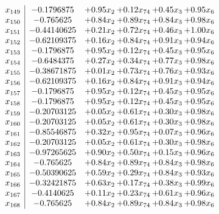 \documentclass[8pt]{article}
\begin{document}
\[\begin{array}{c| c c@{\hskip 2pt} c@{\hskip 2pt} c@{\hskip 2pt} c@{\hskip 2pt} }
 x_{149}   &  -0.1796875 & +  0.95 x_{2} & +  0.12 x_{74} & +  0.45 x_{3} & +  0.95 x_{6}\\
 x_{150}   &  -0.765625 & +  0.84 x_{2} & +  0.89 x_{74} & +  0.84 x_{3} & +  0.98 x_{6}\\
 x_{151}   &  -0.44140625 & +  0.21 x_{2} & +  0.72 x_{74} & +  0.46 x_{3} & +  1.00 x_{6}\\
 x_{152}   &  -0.62109375 & +  0.16 x_{2} & +  0.84 x_{74} & +  0.91 x_{3} & +  0.94 x_{6}\\
 x_{153}   &  -0.1796875 & +  0.95 x_{2} & +  0.12 x_{74} & +  0.45 x_{3} & +  0.95 x_{6}\\
 x_{154}   &  -0.6484375 & +  0.27 x_{2} & +  0.34 x_{74} & +  0.77 x_{3} & +  0.98 x_{6}\\
 x_{155}   &  -0.38671875 & +  0.01 x_{2} & +  0.73 x_{74} & +  0.76 x_{3} & +  0.93 x_{6}\\
 x_{156}   &  -0.62109375 & +  0.16 x_{2} & +  0.84 x_{74} & +  0.91 x_{3} & +  0.94 x_{6}\\
 x_{157}   &  -0.1796875 & +  0.95 x_{2} & +  0.12 x_{74} & +  0.45 x_{3} & +  0.95 x_{6}\\
 x_{158}   &  -0.1796875 & +  0.95 x_{2} & +  0.12 x_{74} & +  0.45 x_{3} & +  0.95 x_{6}\\
 x_{159}   &  -0.20703125 & +  0.05 x_{2} & +  0.61 x_{74} & +  0.30 x_{3} & +  0.98 x_{6}\\
 x_{160}   &  -0.20703125 & +  0.05 x_{2} & +  0.61 x_{74} & +  0.30 x_{3} & +  0.98 x_{6}\\
 x_{161}   &  -0.85546875 & +  0.32 x_{2} & +  0.95 x_{74} & +  0.07 x_{3} & +  0.96 x_{6}\\
 x_{162}   &  -0.20703125 & +  0.05 x_{2} & +  0.61 x_{74} & +  0.30 x_{3} & +  0.98 x_{6}\\
 x_{163}   &  -0.97265625 & +  0.90 x_{2} & +  0.50 x_{74} & +  0.15 x_{3} & +  0.96 x_{6}\\
 x_{164}   &  -0.765625 & +  0.84 x_{2} & +  0.89 x_{74} & +  0.84 x_{3} & +  0.98 x_{6}\\
 x_{165}   &  -0.50390625 & +  0.59 x_{2} & +  0.29 x_{74} & +  0.84 x_{3} & +  0.93 x_{6}\\
 x_{166}   &  -0.32421875 & +  0.63 x_{2} & +  0.17 x_{74} & +  0.38 x_{3} & +  0.99 x_{6}\\
 x_{167}   &  -0.4140625 & +  0.11 x_{2} & +  0.23 x_{74} & +  0.61 x_{3} & +  0.96 x_{6}\\
 x_{168}   &  -0.765625 & +  0.84 x_{2} & +  0.89 x_{74} & +  0.84 x_{3} & +  0.98 x_{6}\\

\end{array}\]
\end{document}
